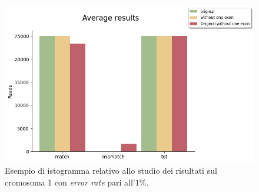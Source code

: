 \documentclass[a4paper,12pt, oneside]{book}
\begin{document}
\begin{figure}
  \centering
  \includegraphics[scale = 0.65]{img/data1.png}
  \caption{Esempio di istogramma relativo allo studio dei risultati sul
    cromosoma 1 con \textit{error rate} pari all'$1\%$.}
  \label{data}
\end{figure}
\end{document}
